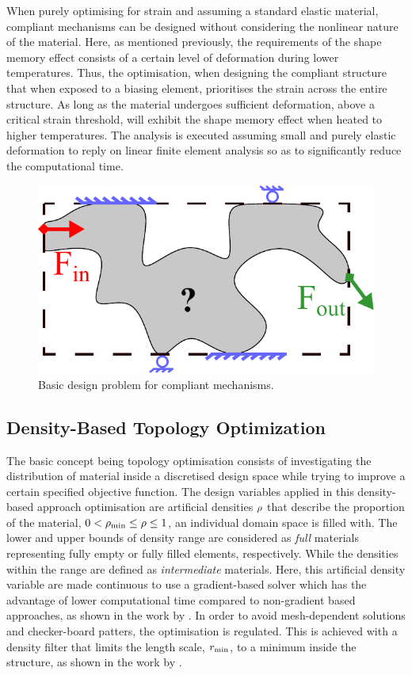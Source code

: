 When purely optimising for strain and assuming a standard elastic material, compliant mechanisms can be designed without considering the nonlinear nature of the material. Here, as mentioned previously, the requirements of the shape memory effect consists of a certain level of deformation during lower temperatures. Thus, the optimisation, when designing the compliant structure that when exposed to a biasing element, prioritises the strain across the entire structure. As long as the material undergoes sufficient deformation, above a critical strain threshold, will exhibit the shape memory effect when heated to higher temperatures. The analysis is executed assuming small and purely elastic deformation to reply on linear finite element analysis so as to significantly reduce the computational time.

\begin{figure}[hbt!]
    \centering
    \includegraphics[width=0.5\columnwidth]{images/chap5/TOM-wp.pdf}
    \caption{Basic design problem for compliant mechanisms.}
    \label{fig:ComplProb}
\end{figure}

\subsection{Density-Based Topology Optimization}
The basic concept being topology optimisation consists of investigating the distribution of material inside a discretised design space while trying to improve a certain specified objective function. The design variables applied in this density-based approach optimisation are artificial densities $\rho$ that describe the proportion of the material, $0<\rho_\text{min} \leq \rho \leq 1$, an individual domain space is filled with. The lower and upper bounds of density range are considered as \textit{full} materials representing fully empty or fully filled elements, respectively. While the densities within the range are defined as \textit{intermediate} materials. Here, this artificial density variable are made continuous to use a gradient-based solver which has the advantage of lower computational time compared to non-gradient based approaches, as shown in the work by \cite{sigmundUsefulnessNongradientApproaches2011}. In order to avoid mesh-dependent solutions and checker-board patters, the optimisation is regulated. This is achieved with a density filter that limits the length scale, $r_\text{min}$, to a minimum inside the structure, as shown in the work by \cite{bendsoeTopologyOptimizationTheory2013}.

